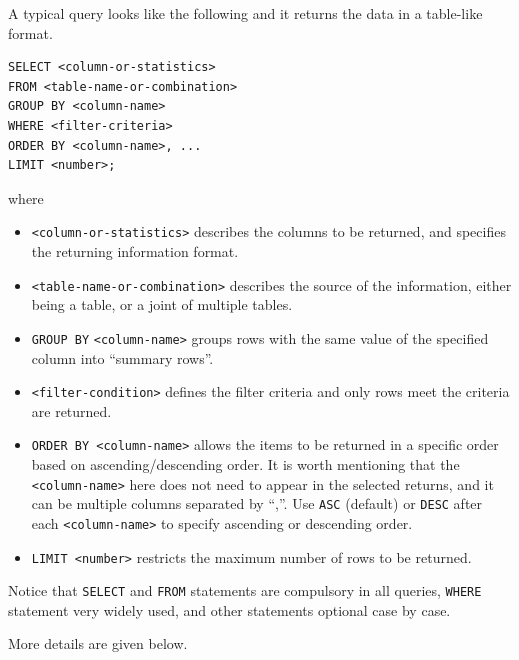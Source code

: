 A typical query looks like the following and it returns the data in a table-like format.
\begin{lstlisting}
SELECT <column-or-statistics>
FROM <table-name-or-combination>
GROUP BY <column-name>
WHERE <filter-criteria>
ORDER BY <column-name>, ...
LIMIT <number>;
\end{lstlisting}
where
\begin{itemize}
\item \verb|<column-or-statistics>| describes the columns to be returned, and specifies the returning information format.
\item \verb|<table-name-or-combination>| describes the source of the information, either being a table, or a joint of multiple tables.
\item \verb|GROUP BY| \verb|<column-name>| groups rows with the same value of the specified column into ``summary rows''.
\item \verb|<filter-condition>| defines the filter criteria and only rows meet the criteria are returned.
\item \verb|ORDER BY <column-name>| allows the items to be returned in a specific order based on ascending/descending order. It is worth mentioning that the \verb|<column-name>| here does not need to appear in the selected returns, and it can be multiple columns separated by ``,''. Use \verb|ASC| (default) or \verb|DESC| after each \verb|<column-name>| to specify ascending or descending order.
\item \verb|LIMIT <number>| restricts the maximum number of rows to be returned.
\end{itemize}
Notice that \verb|SELECT| and \verb|FROM| statements are compulsory in all queries, \verb|WHERE| statement very widely used, and other statements optional case by case.

More details are given below.

